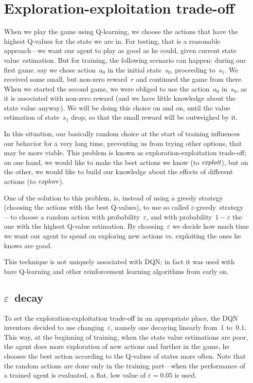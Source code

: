 \section{Exploration-exploitation trade-off}
When we play the game using Q-learning, we choose the actions that have the highest Q-values for the state we are in. For testing, that is a reasonable approach---we want our agent to play as good as he could, given current state value~estimation. But for training, the following scenario can happen: during our first game, say we chose action~$a_0$ in the initial state~$s_0$, proceeding to~$s_1$. We received some small, but non-zero reward~$r$ and continued the game from there. When we started the second game, we were obliged to use the action~$a_0$ in~$s_0$, as it is associated with non-zero reward (and we have little knowledge about the state value anyway). We will be doing this choice on and on, until the value estimation of state~$s_1$ drop, so that the small reward will be outweighed by it.

In this situation, our basically random choice at the start of training influences our behavior for a very long time, preventing us from trying other options, that may be more viable. This problem is known as exploration-exploitation trade-off; on one hand, we would like to make the best actions we know (to $\emph{exploit}$), but on the other, we would like to build our knowledge about the effects of different actions (to $\emph{explore}$).

One of the solution to this problem, is, instead of using a greedy strategy (choosing the actions with the best Q-values), to use so called $\varepsilon$-greedy~strategy---to choose a random action with probability~$\varepsilon$, and with probability~$1 - \varepsilon$ the one with the highest Q-value estimation. By choosing~$\varepsilon$ we decide how much time we want our agent to spend on exploring new actions vs. exploiting the ones he knows are good.

This technique is not uniquely associated with DQN; in fact it was used with bare Q-learning and other reinforcement learning algorithms from early on.

\discussed

\subsection{$\varepsilon$~decay}
To set the exploration-exploitation trade-off in an appropriate place, the DQN inventors decided to use changing~$\varepsilon$, namely one decaying linearly from~$1$ to~$0.1$. This way, at the beginning of training, when the state value estimations are poor, the agent does more exploration of new actions and further in the game, he chooses the best action according to the Q-values of states more often. Note that the random actions are done only in the training part---when the performance of a trained agent is evaluated, a flat, low value of $\varepsilon=0.05$ is used.

